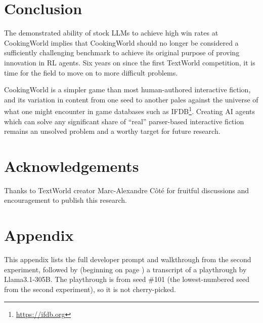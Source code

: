 \documentclass{article}
\begin{document}
\section{Conclusion}
The demonstrated ability of stock LLMs to achieve high win rates at CookingWorld
implies that CookingWorld should no longer be considered a sufficiently
challenging benchmark to achieve its original purpose of proving innovation in
RL agents. Six years on since the first TextWorld competition, it is time for
the field to move on to more difficult problems.

CookingWorld is a simpler game than most human-authored interactive fiction, and
its variation in content from one seed to another pales against the universe of
what one might encounter in game databases such as
IFDB\footnote{\url{https://ifdb.org}}. Creating AI agents which can solve any
significant share of ``real'' parser-based interactive fiction remains an
unsolved problem and a worthy target for future research.

\section*{Acknowledgements}
Thanks to TextWorld creator Marc-Alexandre C\^ot\'e for fruitful discussions and
encouragement to publish this research.

\printbibliography
\newpage
\section*{Appendix}
This appendix lists the full developer prompt and walkthrough from the second
experiment, followed by (beginning on page \pageref{transcript}) a transcript of
a playthrough by Llama3.1-305B. The playthrough is from seed \#101 (the
lowest-numbered seed from the second experiment), so it is not cherry-picked.


\end{document}
